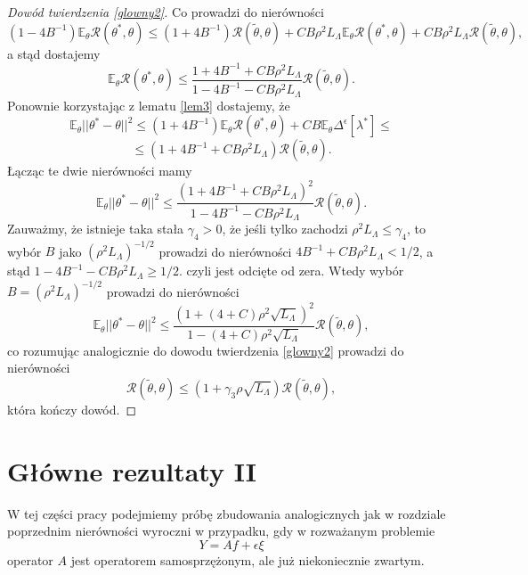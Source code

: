 \documentclass{article}
\begin{document}
\begin{proof}[Dowód twierdzenia \ref{glowny2}]
Co prowadzi do nierówności
\begin{displaymath}
(1-4B^{-1})\mathbb{E}_{\theta}\mathcal{R}(\theta^*,\theta)\leq (1+4B^{-1})\mathcal{R}(\tilde{\theta},\theta)+CB\rho^2L_{\Lambda}\mathbb{E}_{\theta}\mathcal{R}(\theta^*,\theta)+CB\rho^2L_{\Lambda}\mathcal{R}(\tilde{\theta},\theta),
\end{displaymath}
a stąd dostajemy
\begin{displaymath}
\mathbb{E}_{\theta}\mathcal{R}(\theta^*,\theta)\leq\frac{1+4B^{-1}+CB\rho^2L_{\Lambda}}{1-4B^{-1}-CB\rho^2L_{\Lambda}}\mathcal{R}(\tilde{\theta},\theta).
\end{displaymath}
Ponownie korzystając z lematu \ref{lem3} dostajemy, że
\begin{displaymath}
\mathbb{E}_{\theta}||\theta^*-\theta||^2\leq (1+4B^{-1})\mathbb{E}_{\theta}\mathcal{R}(\theta^*,\theta)+CB\mathbb{E}_{\theta}\Delta^{\epsilon}[\lambda^*]\leq
\end{displaymath}
\begin{displaymath}
\leq (1+4B^{-1}+CB\rho^2L_{\Lambda})\mathcal{R}(\tilde{\theta},\theta).
\end{displaymath}
Łącząc te dwie nierówności mamy
\begin{displaymath}
\mathbb{E}_{\theta}||\theta^*-\theta||^2\leq \frac{(1+4B^{-1}+CB\rho^2L_{\Lambda})^2}{1-4B^{-1}-CB\rho^2L_{\Lambda}}\mathcal{R}(\tilde{\theta},\theta).
\end{displaymath}
Zauważmy, że istnieje taka stała $\gamma_4>0$, że jeśli tylko zachodzi $\rho^2L_{\Lambda}\leq \gamma_4$, to wybór $B$ jako $(\rho^2L_{\Lambda})^{-1/2}$ prowadzi do nierówności $4B^{-1}+CB\rho^2L_{\Lambda}<1/2$, a stąd $1-4B^{-1}-CB\rho^2L_{\Lambda}\geq 1/2$. czyli jest odcięte od zera. Wtedy wybór $B=(\rho^2L_{\Lambda})^{-1/2}$ prowadzi do nierówności
\begin{displaymath}
\mathbb{E}_{\theta}||\theta^*-\theta||^2\leq \frac{(1+(4+C)\rho^2\sqrt{L_{\Lambda}})^2}{1-(4+C)\rho^2\sqrt{L_{\Lambda}}}\mathcal{R}(\tilde{\theta},\theta),
\end{displaymath}
co rozumując analogicznie do dowodu twierdzenia \ref{glowny2} prowadzi do nierówności
\begin{displaymath}
\mathcal{R}(\tilde{\theta},\theta)\leq (1+\gamma_3\rho\sqrt{L_{\Lambda}})\mathcal{R}(\tilde{\theta},\theta),
\end{displaymath}
która kończy dowód.
\end{proof}


\section{Główne rezultaty II}
W tej części pracy podejmiemy próbę zbudowania analogicznych jak w rozdziale poprzednim nierówności wyroczni w przypadku, gdy w rozważanym problemie
\begin{displaymath}
Y=Af+\epsilon\xi
\end{displaymath}
operator $A$ jest operatorem samosprzężonym, ale już niekoniecznie zwartym.\\
\end{document}
